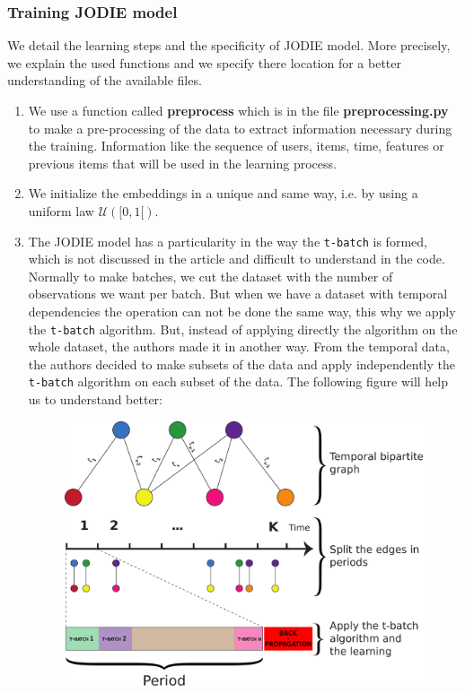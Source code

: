 \subsubsection{Training JODIE model} 

We detail the learning steps and the specificity of JODIE model. More precisely, we explain the used functions and we specify there location for a better understanding of the available files.

\begin{enumerate}
    \item We use a function called \textbf{preprocess} which is in the file \textbf{preprocessing.py} to make a pre-processing of the data to extract information necessary during the training. Information like the sequence of users, items, time, features or previous items that will be used in the learning process.
    \item We initialize the embeddings in a unique and same way, i.e. by using a uniform law $\mathcal{U}([0,1[)$.
    \item The JODIE model has a particularity in the way the \texttt{t-batch} is formed, which is not discussed in the article and difficult to understand in the code. Normally to make batches, we cut the dataset with the number of observations we want per batch. But when we have a dataset with temporal dependencies the operation can not be done the same way, this why we apply the \texttt{t-batch} algorithm. But, instead of applying directly the algorithm on the whole dataset, the authors made it in another way. From the temporal data, the authors decided to make subsets of the data and apply independently the \texttt{t-batch} algorithm on each subset of the data. The following figure will help us to understand better:
    \begin{figure}[H]
        \centering
        \includegraphics[scale = 0.43]{image/pipeline.pdf}

\end{figure}
\end{enumerate}
